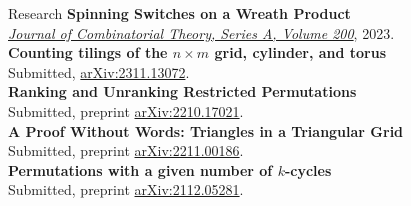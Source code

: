 \documentclass{cv} %
\begin{document}
\begin{rSection}{Research}
  \textbf{Spinning Switches on a Wreath Product} \\
  \href{https://doi.org/10.1016/j.jcta.2023.105795}{\textit{Journal of Combinatorial Theory, Series A, Volume 200}}, 2023. \\
  \textbf{Counting tilings of the $n \times m$ grid, cylinder, and torus}\\
  Submitted, \href{https://arxiv.org/abs/2311.13072}{arXiv:2311.13072}.\\
  \textbf{Ranking and Unranking Restricted Permutations}\\
  Submitted, preprint \href{https://arxiv.org/abs/2210.17021}{arXiv:2210.17021}.\\
  \textbf{A Proof Without Words: Triangles in a Triangular Grid} \\
  Submitted, preprint \href{https://arxiv.org/abs/2211.00186}{arXiv:2211.00186}.\\
  \textbf{Permutations with a given number of $k$-cycles} \\
  Submitted, preprint \href{https://arxiv.org/abs/2112.05281}{arXiv:2112.05281}.\\
\end{rSection}
\end{document}
